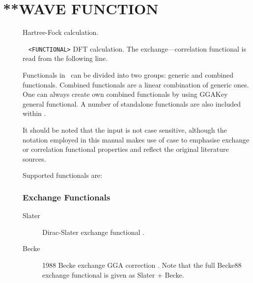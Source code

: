 \section{**WAVE FUNCTION}\label{sec:wavefunc}
\begin{description}
\item[] Hartree-Fock calculation.
\item[] \verb| | \newline
\verb|<FUNCTIONAL>|\newline
DFT calculation. The exchange---correlation functional is read from the following line.

Functionals in \lsdalton\ can be divided into two groups: generic and combined functionals. 
Combined functionals are a linear combination of generic ones. 
One can always create own combined functionals by using GGAKey general functional.
A number of standalone functionals are also included within \lsdalton. 

It should be noted that the input is not case sensitive, although the notation
employed in this manual makes use of case to emphasise exchange or correlation 
functional properties and reflect the original literature sources.

Supported functionals are: 
\subsubsection{Exchange Functionals}
\providecommand\exfn[1]{#1}

\begin{description}
\item[Slater] Dirac-Slater exchange functional \cite{dft:hohenberg,dft:kohn,dft:slater}.

\item[Becke] 1988 Becke exchange GGA correction \cite{dft:becke88}. Note that the full Becke88 exchange functional is given as \exfn{Slater} + \exfn{Becke}.




\end{description}
\end{description}
